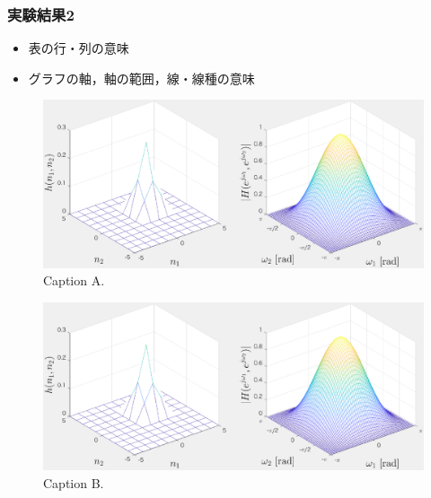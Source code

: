 \documentclass[dvipdfmx,cjk,t,10pt]{beamer}
\begin{document}
\begin{frame}
\frametitle{実験結果2}
	\begin{itemize}
	\item 表の行・列の意味
	\item グラフの軸，軸の範囲，線・線種の意味
	\end{itemize}		
	\vsp
	
	\begin{minipage}{0.46\hsize}
	\begin{figure}[htbp]
	\begin{center}	
	\includegraphics[width=0.95\hsize]{tmp.eps}
	\caption{Caption A.}

	\end{center}	
	\end{figure}	
	\end{minipage}
	\begin{minipage}{0.46\hsize}
	\begin{figure}[htbp]
	\begin{center}	
	\includegraphics[width=0.95\hsize]{tmp.eps}
	\caption{Caption B.}
	\end{center}	
	\end{figure}		
	\end{minipage}		
\end{frame}
\end{document}
